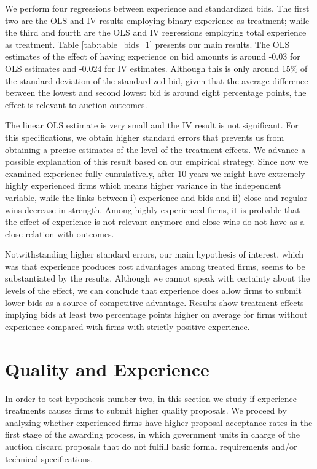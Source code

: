 We perform four regressions between experience and standardized bids. The first two are the OLS and IV results employing binary experience as treatment; while the third and fourth are the OLS and IV regressions employing total experience as treatment. Table \ref{tab:table_bids_1} presents our main results. The OLS estimates of the effect of having experience on bid amounts is around -0.03 for OLS estimates and -0.024 for IV estimates. Although this is only around 15\% of the standard deviation of the standardized bid, given that the average difference between the lowest and second lowest bid is around eight percentage points, the effect is relevant to auction outcomes.

The linear OLS estimate is very small and the IV result is not significant. For this specifications, we obtain higher standard errors that prevents us from obtaining a precise estimates of the level of the treatment effects. We advance a possible explanation of this result based on our empirical strategy. Since now we examined experience fully cumulatively, after 10 years we might have extremely highly experienced firms which means higher variance in the independent variable, while the links between i) experience and bids and ii) close and regular wins decrease in strength. Among highly experienced firms, it is probable that the effect of experience is not relevant anymore and close wins do not have as a close relation with outcomes.



Notwithstanding higher standard errors, our main hypothesis of interest, which was that experience produces cost advantages among treated firms, seems to be substantiated by the results. Although we cannot speak with certainty about the levels of the effect, we can conclude that experience does allow firms to submit lower bids as a source of competitive advantage. Results show treatment effects implying bids at least two percentage points higher on average for firms without experience compared with firms with strictly positive experience.
\newpage

\section{Quality and Experience}
\label{section:qualityexp}
In order to test hypothesis number two, in this section we study if experience treatments causes firms to submit higher quality proposals. We proceed by analyzing whether experienced firms have higher proposal acceptance rates in the first stage of the awarding process, in which government units in charge of the auction discard proposals that do not fulfill basic formal requirements and/or technical specifications.

